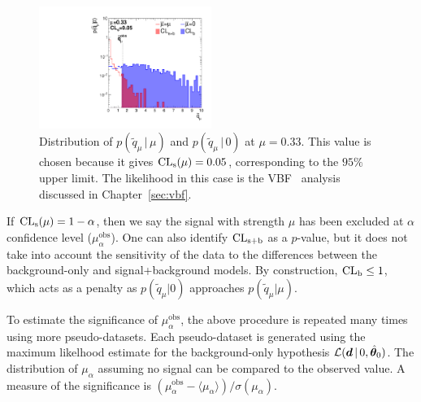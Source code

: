 \begin{figure}[]
    \begin{center}
        \includegraphics[width=0.5\textwidth]{figures/cls/cls.pdf}
        \caption{Distribution of $p(\tilde q_\mu\,|\,\mu)$ and $p(\tilde q_\mu\,|\,0)$ at $\mu = 0.33$. 
                 This value is chosen because it gives $\operatorname{\mathrm{CL}_s}(\mu) = 0.05$, corresponding to the $95\%$ upper limit.
                 The likelihood in this case is the VBF \hinv~analysis discussed in Chapter~\ref{sec:vbf}.}
        \label{fig:cls:cls}
    \end{center}
\end{figure}

If $\operatorname{\mathrm{CL}_s}(\mu) = 1-\alpha$, then we say the signal with strength $\mu$ has been excluded at $\alpha$ confidence level ($\mu_\alpha^\mathrm{obs}$).
One can also identify $\operatorname{\mathrm{CL}_{s+b}}$ as a $p$-value, but it does not take into account the sensitivity of the data to the differences between the background-only and signal+background models.
By construction, $\operatorname{\mathrm{CL}_b} \leq 1$, which acts as a penalty as $p(\tilde q_\mu | 0)$ approaches $p(\tilde q_\mu | \mu)$.

To estimate the significance of $\mu_\alpha^\mathrm{obs}$, the above procedure is repeated many times using more pseudo-datasets.
Each pseudo-dataset is generated using the maximum likelhood estimate for the background-only hypothesis $\mathcal{L}(\bm{d}\,|\,0,\hat{\bm{\theta}}_0)$.
The distribution of $\mu_\alpha$ assuming no signal can be compared to the observed value.
A measure of the significance is $(\mu_\alpha^\mathrm{obs} - \langle\mu_\alpha\rangle) / \sigma(\mu_\alpha)$.


